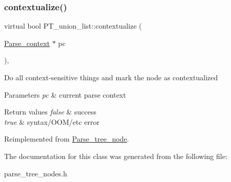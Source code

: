 \subsubsection{\texorpdfstring{contextualize()}{contextualize()}}
{\footnotesize\ttfamily virtual bool P\+T\+\_\+union\+\_\+list\+::contextualize (\begin{DoxyParamCaption}\item[{\mbox{\hyperlink{structParse__context}{Parse\+\_\+context}} $\ast$}]{pc }\end{DoxyParamCaption})\hspace{0.3cm}{\ttfamily [inline]}, {\ttfamily [virtual]}}

Do all context-\/sensitive things and mark the node as contextualized


\begin{DoxyParams}{Parameters}
{\em pc} & current parse context\\
\hline
\end{DoxyParams}

\begin{DoxyRetVals}{Return values}
{\em false} & success \\
\hline
{\em true} & syntax/\+O\+O\+M/etc error \\
\hline
\end{DoxyRetVals}


Reimplemented from \mbox{\hyperlink{classParse__tree__node_a22d93524a537d0df652d7efa144f23da}{Parse\+\_\+tree\+\_\+node}}.



The documentation for this class was generated from the following file\+:\begin{DoxyCompactItemize}
\item 
parse\+\_\+tree\+\_\+nodes.\+h\end{DoxyCompactItemize}
